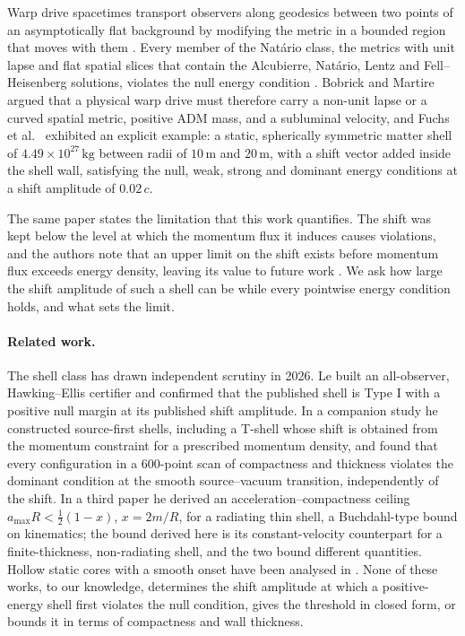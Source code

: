 \documentclass[11pt,a4paper]{article}
\theoremstyle{remark}
\begin{document}
Warp drive spacetimes transport observers along geodesics between two points of an asymptotically flat background by modifying the metric in a bounded region that moves with them \cite{Alcubierre1994,Natario2002}. Every member of the Nat\'ario class, the metrics with unit lapse and flat spatial slices that contain the Alcubierre, Nat\'ario, Lentz \cite{Lentz2021} and Fell--Heisenberg \cite{FellHeisenberg2021} solutions, violates the null energy condition \cite{SSV2022}. Bobrick and Martire \cite{BobrickMartire2021} argued that a physical warp drive must therefore carry a non-unit lapse or a curved spatial metric, positive ADM mass, and a subluminal velocity, and Fuchs et al.\ \cite{Fuchs2024} exhibited an explicit example: a static, spherically symmetric matter shell of $4.49\times10^{27}\,\mathrm{kg}$ between radii of $10\,\mathrm{m}$ and $20\,\mathrm{m}$, with a shift vector added inside the shell wall, satisfying the null, weak, strong and dominant energy conditions at a shift amplitude of $0.02\,c$.

The same paper states the limitation that this work quantifies. The shift was kept below the level at which the momentum flux it induces causes violations, and the authors note that an upper limit on the shift exists before momentum flux exceeds energy density, leaving its value to future work \cite{Fuchs2024}. We ask how large the shift amplitude of such a shell can be while every pointwise energy condition holds, and what sets the limit.

\paragraph{Related work.} The shell class has drawn independent scrutiny in 2026. Le \cite{Le2026cert} built an all-observer, Hawking--Ellis certifier and confirmed that the published shell is Type I with a positive null margin at its published shift amplitude. In a companion study \cite{Le2026shells} he constructed source-first shells, including a T-shell whose shift is obtained from the momentum constraint for a prescribed momentum density, and found that every configuration in a 600-point scan of compactness and thickness violates the dominant condition at the smooth source--vacuum transition, independently of the shift. In a third paper \cite{Le2026steer} he derived an acceleration--compactness ceiling $a_{\max}R < \tfrac12(1-x)$, $x = 2m/R$, for a radiating thin shell, a Buchdahl-type bound on kinematics; the bound derived here is its constant-velocity counterpart for a finite-thickness, non-radiating shell, and the two bound different quantities. Hollow static cores with a smooth onset have been analysed in \cite{HollowCores2026}. None of these works, to our knowledge, determines the shift amplitude at which a positive-energy shell first violates the null condition, gives the threshold in closed form, or bounds it in terms of compactness and wall thickness.
\end{document}
